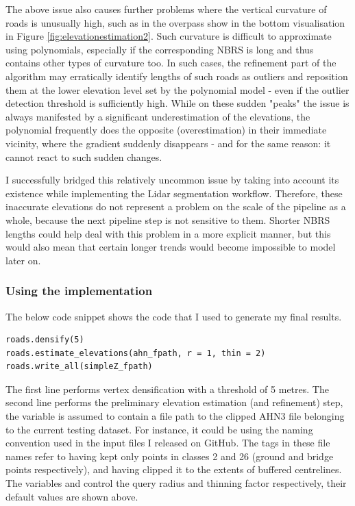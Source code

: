 The above issue also causes further problems where the vertical curvature of roads is unusually high, such as in the overpass show in the bottom visualisation in Figure \ref{fig:elevationestimation2}. Such curvature is difficult to approximate using polynomials, especially if the corresponding NBRS is long and thus contains other types of curvature too. In such cases, the refinement part of the algorithm may erratically identify lengths of such roads as outliers and reposition them at the lower elevation level set by the polynomial model - even if the outlier detection threshold is sufficiently high. While on these sudden "peaks" the issue is always manifested by a significant underestimation of the elevations, the polynomial frequently does the opposite (overestimation) in their immediate vicinity, where the gradient suddenly disappears - and for the same reason: it cannot react to such sudden changes.

I successfully bridged this relatively uncommon issue by taking into account its existence while implementing the Lidar segmentation workflow. Therefore, these inaccurate elevations do not represent a problem on the scale of the pipeline as a whole, because the next pipeline step is not sensitive to them. Shorter NBRS lengths could help deal with this problem in a more explicit manner, but this would also mean that certain longer trends would become impossible to model later on.

\subsubsection{Using the implementation}

The below code snippet shows the code that I used to generate my final results.

\begin{lstlisting}
roads.densify(5)
roads.estimate_elevations(ahn_fpath, r = 1, thin = 2)
roads.write_all(simpleZ_fpath)
\end{lstlisting}

The first line performs vertex densification with a threshold of 5 metres. The second line performs the preliminary elevation estimation (and refinement) step, the variable  is assumed to contain a file path to the clipped AHN3 file belonging to the current testing dataset. For instance, it could be  using the naming convention used in the input files I released on GitHub. The tags  in these file names refer to having kept only points in classes 2 and 26 (ground and bridge points respectively), and having clipped it to the extents of buffered centrelines. The variables  and  control the query radius and thinning factor respectively, their default values are shown above.

